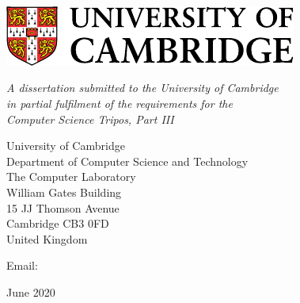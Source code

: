 \begin{titlepage} 

\begin{center}
\noindent
\huge
\dissertationtitle \\
\end{center}

\begin{center}
\noindent
\huge
\authorname \\
\Large
\authorcollege      \\[24pt]
\includegraphics{figures/CUni3.pdf}
\end{center}

\vspace{24pt} 

\begin{center}
\noindent
\large
{\it A dissertation submitted to the University of Cambridge \\ 
in partial fulfilment of the requirements for the\\ 
Computer Science Tripos, Part III} 
\end{center}

\begin{center}
\noindent
University of Cambridge \\
Department of Computer Science and Technology \\
The Computer Laboratory \\
William Gates Building  \\
15 JJ Thomson Avenue    \\
Cambridge CB3 0FD       \\
{\sc United Kingdom}    \\
\end{center}

\begin{center}
\noindent
Email: \authoremail \\
\end{center}

\begin{center}
\noindent
June 2020
\end{center}

\end{titlepage} 

\newpage
\vspace*{\fill}
